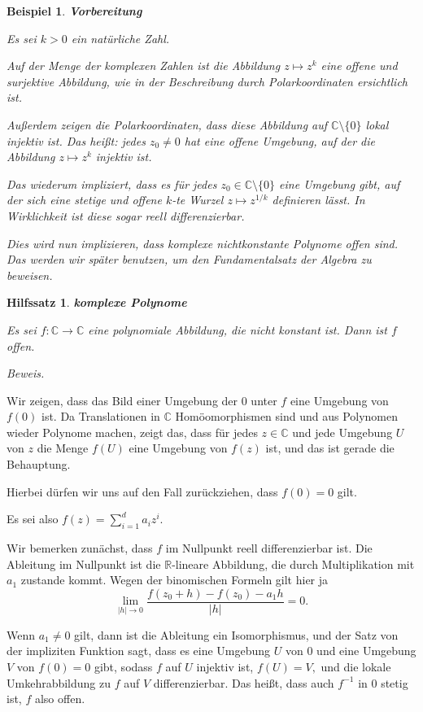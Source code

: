 \documentclass[12pt]{scrbook}   %
\newtheorem{hilfsX}[alles]{Hilfssatz}
\newenvironment{hilfs}[1]{\begin{hilfsX}{\bf #1}\par}{\end{hilfsX}}
\newtheorem{bspX}[alles]{Beispiel}
\newenvironment{bsp}[1]{\begin{bspX}{\bf #1}\par\rm}{\end{bspX}}
\begin{document}
\begin{bsp}{\bf Vorbereitung} \label{kte Wurzel}
 
{\rm Es sei $k>0$ ein natürliche Zahl.

Auf der Menge der komplexen Zahlen ist die Abbildung $z\mapsto z^k$ eine offene 
und surjektive Abbildung, wie in der Beschreibung durch Polarkoordinaten 
ersichtlich ist.

Außerdem zeigen die Polarkoordinaten, dass diese Abbildung auf 
$\mathbb C\setminus\{0\}$ lokal injektiv ist. Das heißt: jedes 
$z_0\neq 0$ hat eine offene Umgebung, auf der die Abbildung $z\mapsto z^k$ 
injektiv ist.

Das wiederum impliziert, dass es für jedes $z_0\in \mathbb 
C\setminus\{0\}$ eine Umgebung gibt, auf der sich eine stetige und offene
$k$-te Wurzel $z\mapsto z^{1/k}$ definieren lässt. In Wirklichkeit ist
diese sogar reell differenzierbar.

Dies wird nun implizieren, dass komplexe nichtkonstante Polynome offen sind.
Das werden wir später benutzen, um den Fundamentalsatz der Algebra zu 
beweisen.
}
\end{bsp}
 
\begin{hilfs}{\bf komplexe Polynome} \label{Polynom-offen}

Es sei $f:\mathbb C\longrightarrow \mathbb C$ eine polynomiale Abbildung,
die nicht konstant ist. Dann ist $f$ offen.
\end{hilfs}

{\it Beweis.}

Wir zeigen, dass das Bild einer Umgebung der $0$ unter $f$ eine Umgebung von 
$f(0)$ ist. Da Translationen in $\mathbb C$ Homöomorphismen sind und aus 
Polynomen wieder Polynome machen, zeigt das, dass für jedes $z\in \mathbb C$
und jede Umgebung $U$ von $z$ die Menge $f(U)$ eine Umgebung von $f(z)$ ist,
und das ist gerade die Behauptung.

Hierbei dürfen wir uns auf den Fall zurückziehen, dass $f(0)=0$ gilt.

Es sei also $f(z) = \sum_{i=1}^d a_iz^i.$

Wir bemerken zunächst, dass $f$ im Nullpunkt reell differenzierbar ist. 
Die Ableitung im Nullpunkt ist die $\mathbb R$-lineare Abbildung, die durch 
Multiplikation mit $a_1$ zustande kommt. Wegen der 
binomischen Formeln gilt hier ja
$$\lim_{|h|\to 0} \frac{f(z_0+h) - f(z_0) - a_1h }{|h|} = 0.$$

Wenn $a_1\neq 0$ gilt, dann ist die Ableitung ein Isomorphismus, und der 
Satz von der impliziten Funktion sagt, dass
es eine Umgebung $U$ von $0$ und eine Umgebung $V$ von $f(0)=0$ gibt, sodass
$f$ auf $U$ injektiv ist, $f(U) = V,$ und die lokale Umkehrabbildung zu $f$
auf $V$ differenzierbar. Das heißt, dass auch $f^{-1}$ in $0$ stetig ist, 
$f$ also offen.
\end{document}
